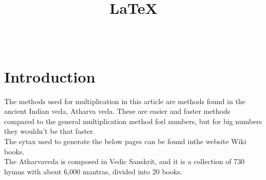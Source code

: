 \documentclass[12pt,a4paper]{article}
\title{\LaTeX}
\author{
	\hspace{4in}{Dheeraj Athrey}\\
}
\begin{document}
\maketitle


\section*{Introduction}


The methods used for multiplication in this article are methods found in the ancient Indian veda, Atharva veda\cite{bloomfield1899atharvaveda}\cite{India1000shaping}. These are easier and faster methods compared to the general multiplication method forl numbers, but for big numbers they wouldn't be that faster.\\
The sytax used to generate the below pages can be found inthe website Wiki books\cite{website:Wikibooks}.\\


The Atharvaveda is composed in Vedic Sanskrit, and it is a collection of 730 hymns with about 6,000 mantras, divided into 20 books.\\





\end{document}
